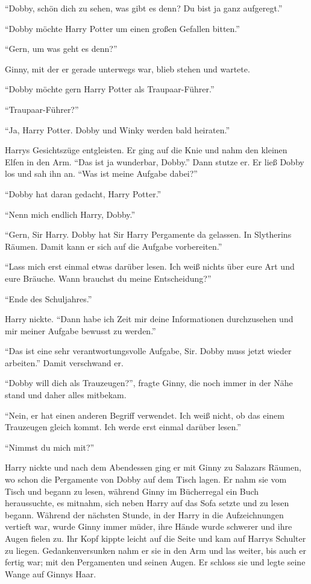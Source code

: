 \enquote{Dobby, schön dich zu sehen, was gibt es denn? Du bist ja ganz aufgeregt.}

\enquote{Dobby möchte Harry Potter um einen großen Gefallen bitten.}

\enquote{Gern, um was geht es denn?}

Ginny, mit der er gerade unterwegs war, blieb stehen und wartete.

\enquote{Dobby möchte gern Harry Potter als Traupaar-Führer.}

\enquote{Traupaar-Führer?}

\enquote{Ja, Harry Potter. Dobby und Winky werden bald heiraten.}

Harrys Gesichtszüge entgleisten. Er ging auf die Knie und nahm den kleinen Elfen in den Arm. \enquote{Das ist ja wunderbar, Dobby.} Dann stutze er. Er ließ Dobby los und sah ihn an. \enquote{Was ist meine Aufgabe dabei?}

\enquote{Dobby hat daran gedacht, Harry Potter.}

\enquote{Nenn mich endlich Harry, Dobby.}

\enquote{Gern, Sir Harry. Dobby hat Sir Harry Pergamente da gelassen. In Slytherins Räumen. Damit kann er sich auf die Aufgabe vorbereiten.}

\enquote{Lass mich erst einmal etwas darüber lesen. Ich weiß nichts über eure Art und eure Bräuche. \gst Wann brauchst du meine Entscheidung?}

\enquote{Ende des Schuljahres.}

Harry nickte. \enquote{Dann habe ich Zeit mir deine Informationen durchzusehen und mir meiner Aufgabe bewusst zu werden.}

\enquote{Das ist eine sehr verantwortungsvolle Aufgabe, Sir. \gst Dobby muss jetzt wieder arbeiten.} Damit verschwand er.

\enquote{Dobby will dich als Trauzeugen?}, fragte Ginny, die noch immer in der Nähe stand und daher alles mitbekam.

\enquote{Nein, er hat einen anderen Begriff verwendet. Ich weiß nicht, ob das einem Trauzeugen gleich kommt. Ich werde erst einmal darüber lesen.}

\enquote{Nimmst du mich mit?}

Harry nickte und nach dem Abendessen ging er mit Ginny zu Salazars Räumen, wo schon die Pergamente von Dobby auf dem Tisch lagen. Er nahm sie vom Tisch und begann zu lesen, während Ginny im Bücherregal ein Buch heraussuchte, es mitnahm, sich neben Harry auf das Sofa setzte und zu lesen begann. Während der nächsten Stunde, in der Harry in die Aufzeichnungen vertieft war, wurde Ginny immer müder, ihre Hände wurde schwerer und ihre Augen fielen zu. Ihr Kopf kippte leicht auf die Seite und kam auf Harrys Schulter zu liegen. Gedankenversunken nahm er sie in den Arm und las weiter, bis auch er fertig war; mit den Pergamenten und seinen Augen. Er schloss sie und legte seine Wange auf Ginnys Haar.

